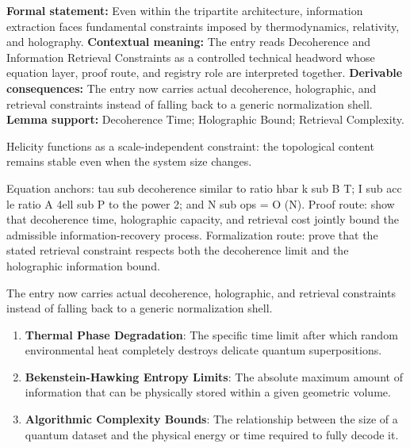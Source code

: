 \begingroup\footnotesize\setlength{\emergencystretch}{3em}\sloppy
\textbf{Formal statement:} Even within the tripartite architecture, information extraction faces fundamental constraints imposed by thermodynamics, relativity, and holography. \textbf{Contextual meaning:} The entry reads Decoherence and Information Retrieval Constraints as a controlled technical headword whose equation layer, proof route, and registry role are interpreted together. \textbf{Derivable consequences:} The entry now carries actual decoherence, holographic, and retrieval constraints instead of falling back to a generic normalization shell. \textbf{Lemma support:} Decoherence Time; Holographic Bound; Retrieval Complexity.\par
\endgroup

Helicity functions as a scale-independent constraint: the topological content remains stable even when the system size changes.

Equation anchors: tau sub decoherence similar to ratio hbar k sub B T; I sub acc le ratio A 4ell sub P to the power 2; and N sub ops = O (N). Proof route: show that decoherence time, holographic capacity, and retrieval cost jointly bound the admissible information-recovery process. Formalization route: prove that the stated retrieval constraint respects both the decoherence limit and the holographic information bound.

The entry now carries actual decoherence, holographic, and retrieval constraints instead of falling back to a generic normalization shell.
\endgroup

\begin{enumerate}[leftmargin=1.6em,itemsep=6pt,topsep=4pt]
\item \textbf{Thermal Phase Degradation}: The specific time limit after which random environmental heat completely destroys delicate quantum superpositions.
\item \textbf{Bekenstein-Hawking Entropy Limits}: The absolute maximum amount of information that can be physically stored within a given geometric volume.
\item \textbf{Algorithmic Complexity Bounds}: The relationship between the size of a quantum dataset and the physical energy or time required to fully decode it.
\end{enumerate}

